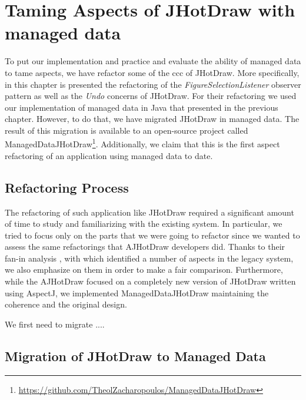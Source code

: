 
\chapter{Taming Aspects of JHotDraw with managed data}\label{AspectRefactoring}

To put our implementation and practice and evaluate the ability of managed data to tame aspects, we have refactor some of the \ac{ccc} of JHotDraw.
More specifically, in this chapter is presented the refactoring of the \textit{FigureSelectionListener} observer pattern as well as the \textit{Undo} concerns of JHotDraw.
For their refactoring we used our implementation of managed data in Java that presented in the previous chapter.
However, to do that, we have migrated JHotDraw in managed data.
The result of this migration is available to an open-source project called ManagedDataJHotDraw\footnote{\url{https://github.com/TheolZacharopoulos/ManagedDataJHotDraw}}.
Additionally, we claim that this is the first aspect refactoring of an application using managed data to date.

\section{Refactoring Process}
The refactoring of such application like JHotDraw required a significant amount of time to study and familiarizing with the existing system.
In particular, we tried to focus only on the parts that we were going to refactor since we wanted to assess the same refactorings that AJHotDraw developers \cite{marinajhotdraw} did.
Thanks to their fan-in analysis \cite{marin2004identifying}, with which identified a number of aspects in the legacy system, we also emphasize on them in order to make a fair comparison.
Furthermore, while the AJHotDraw focused on a completely new version of JHotDraw written using AspectJ, we implemented ManagedDataJHotDraw maintaining the coherence and the original design.

We first need to migrate ....

\section{Migration of JHotDraw to Managed Data}

